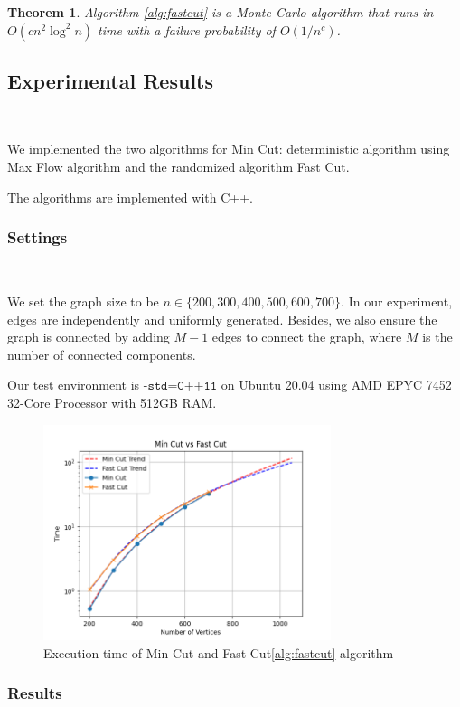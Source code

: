 \documentclass[12pt]{article}
\theoremstyle{plain}
\newtheorem{theorem}{Theorem}[section]
\begin{document}
\begin{theorem}
    Algorithm \ref{alg:fastcut} is a Monte Carlo algorithm that runs in $O(cn^2\log^2 n)$ time with a failure probability of $O(1/n^c)$.
\end{theorem}

\subsection{Experimental Results}\

We implemented the two algorithms for Min Cut: deterministic algorithm using Max Flow algorithm and the randomized algorithm Fast Cut.

The algorithms are implemented with C++.

\subsubsection{Settings}\

We set the graph size to be $n\in\{200,300,400,500,600,700\}$. In our experiment, edges are independently and uniformly generated. Besides, we also ensure the graph is connected by adding $M-1$ edges to connect the graph, where $M$ is the number of connected components.

Our test environment is $\texttt{-std=C++11}$ on Ubuntu 20.04 using AMD EPYC 7452 32-Core Processor with 512GB RAM.

\begin{figure}[ht]
    \centering
    \includegraphics[width=0.75\textwidth]{../MinCut/MinCut.png}
    \caption{Execution time of Min Cut and Fast Cut\ref{alg:fastcut} algorithm}
    \label{fig:mc}
\end{figure}

\subsubsection{Results}\
\end{document}
